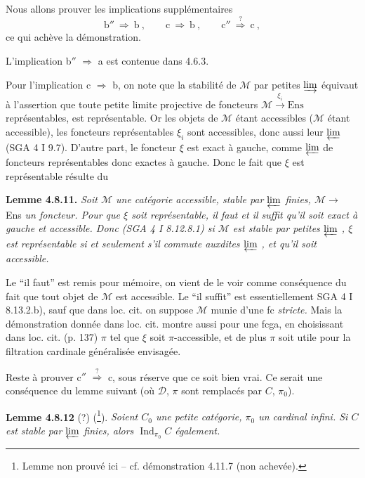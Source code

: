 \documentclass[11pt]{article}
\newcommand{\printedpage}[1]{\marginpar{\footnotesize p.~#1}}
\newcommand{\msp}[1]{\marginpar{\footnotesize [#1]}}
\newcommand{\Ind}{\operatorname{Ind}}
\newcommand{\Ens}{\mathrm{Ens}}
\newcommand{\cM}{\mathcal{M}}
\newcommand{\cD}{\mathcal{D}}
\begin{document}
\msp{page 210}

Nous allons prouver les implications supplémentaires
\[
\text{b}'' \ \Longrightarrow\ \text{b}\ , \qquad \text{c} \ \Longrightarrow\ \text{b}\ , \qquad \text{c}'' \ \overset{?}{\Longrightarrow}\ \text{c}\ ,
\]
ce qui achève la démonstration.

L'implication b$''$ $\Longrightarrow$ a est contenue dans 4.6.3.

Pour l'implication c $\Longrightarrow$ b, on note que la stabilité de $\cM$ par petites $\varinjlim$ équivaut à l'assertion que toute petite limite projective de foncteurs $\cM \xrightarrow{\ \xi_i\ } \Ens$ représentables, est représentable. Or les objets de $\cM$ étant accessibles ($\cM$ étant accessible), les foncteurs représentables $\xi_i$ sont accessibles, donc aussi leur $\varprojlim$ (SGA 4 I 9.7). D'autre part, le foncteur $\xi$ est exact à gauche, comme $\varprojlim$ de foncteurs représentables donc exactes à gauche. Donc le fait que $\xi$ est représentable résulte du %

\textbf{Lemme 4.8.11.} \textit{Soit $\cM$ une catégorie accessible, stable par $\varprojlim$ finies, $\cM \longrightarrow$} Ens \textit{un foncteur. Pour que $\xi$ soit représentable, il faut et il suffit qu'il soit exact à gauche et accessible. Donc (SGA 4 I 8.12.8.1) si $\cM$ est stable par petites $\varprojlim$ , $\xi$ est représentable si et seulement s'il commute auxdites $\varprojlim$ , et qu'il soit accessible.}


\printedpage{75}

\msp{page 211}

Le ``il faut'' est remis pour mémoire, on vient de le voir comme conséquence du fait que tout objet de $\cM$ est accessible. Le ``il suffit'' est essentiellement SGA 4 I 8.13.2.b), sauf que dans loc. cit. on suppose $\cM$ munie d'une fc \textit{stricte.} Mais la démonstration donnée dans loc. cit. montre aussi pour une fcga, en choisissant dans loc. cit. (p. 137) $\pi$ tel que $\xi$ soit $\pi$-accessible, et de plus $\pi$ soit utile pour la filtration cardinale généralisée envisagée.

Reste à prouver c$''$ $\overset{?}{\Longrightarrow}$ c, sous réserve que ce soit bien vrai. Ce serait une conséquence du lemme suivant (où $\cD$, $\pi$ sont remplacés par $C$, $\pi_0$).

\textbf{Lemme 4.8.12} (?) (\footnote[88]{Lemme non prouvé ici -- cf. démonstration 4.11.7 (non achevée).}). \textit{Soient $C_0$ une petite catégorie, $\pi_0$ un cardinal infini. Si $C$ est stable par $\varprojlim$ finies, alors $\Ind_{\pi_0}C$ également.} %
\end{document}
